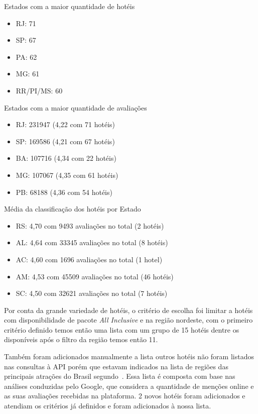 Estados com a maior quantidade de hotéis
\begin{itemize}
	\item RJ: 71
	\item SP: 67
	\item PA: 62
	\item MG: 61
	\item RR/PI/MS: 60
\end{itemize}

Estados com a maior quantidade de avaliações

\begin{itemize}
	\item RJ: 231947 (4,22 com 71 hotéis)
	\item SP: 169586 (4,21 com 67 hotéis)
	\item BA: 107716 (4,34 com 22 hotéis)
	\item MG: 107067 (4,35 com 61 hotéis)
	\item PB: 68188 (4,36 com 54 hotéis)
\end{itemize}


Média da classificação dos hotéis por Estado

\begin{itemize}
	\item RS: 4,70 com 9493 avaliações no total (2 hotéis)
	\item AL: 4,64 com 33345 avaliações no total (8 hotéis)
	\item AC: 4,60 com 1696 avaliações no total (1 hotel)
	\item AM: 4,53 com 45509 avaliações no total (46 hotéis)
	\item SC: 4,50 com 32621 avaliações no total (7 hotéis)
\end{itemize}

Por conta da grande variedade de hotéis, o critério de escolha foi limitar a hotéis com disponibilidade de pacote \emph{All Inclusive} e na região nordeste, com o primeiro critério definido temos então uma lista com um grupo de 15 hotéis dentre os disponíveis após o filtro da região temos então 11.

Também foram adicionados manualmente a lista outros hotéis não foram listados nas consultas à API porém que estavam indicados na lista de regiões das principais atrações do Brasil segundo~\cite{googleFlights2022destinos}. Essa lista é composta com base nas análises conduzidas pelo Google, que considera a quantidade de menções online e as suas avaliações recebidas na plataforma. 2 novos hotéis foram adicionados e atendiam os critérios já definidos e foram adicionados à nossa lista.

